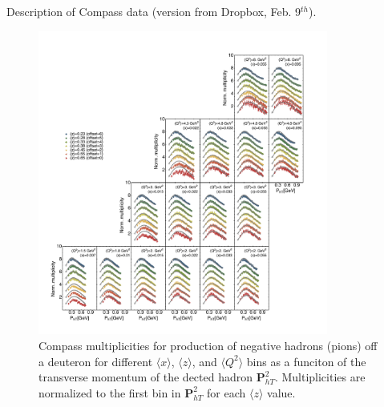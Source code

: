 \documentclass[aps,preprintnumbers,showpacs,nofootinbib,superscriptaddress,floatfix]{revtex4}
\begin{document}
Description of Compass data (version from Dropbox, Feb. 9$^{th}$).
\begin{figure}[h!]
\begin{center}
\includegraphics[width=0.85\textwidth]{plots/Compass/COMPASS_SCIplot_flINDEP_Piminus.pdf}
\end{center}
\caption{Compass multiplicities for production of negative hadrons (pions) off a deuteron for different $\langle x \rangle$, $\langle z \rangle$, and $\langle Q^2 \rangle$ bins as a funciton of the transverse momentum of the dected hadron ${\bm P}_{hT}^ 2$. Multiplicities are normalized to the first bin in ${\bm P}_{hT}^ 2$ for each $\langle z \rangle$ value.} 
\label{f:C_pim}
\end{figure}
\end{document}
